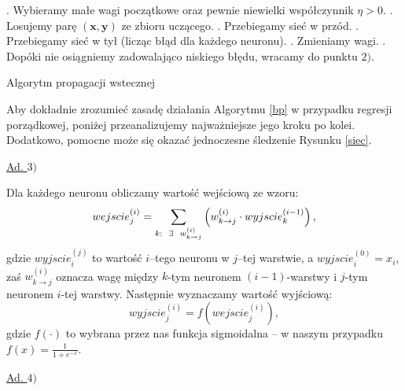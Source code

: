\documentclass{mini}
\begin{document}
\begin{algorithm}
\begin{algorithmic}
\STATE
{}. Wybieramy małe wagi początkowe oraz pewnie niewielki współczynnik $\eta>0$.
\STATE
{}. Losujemy parę $(\textbf{x},\textbf{y})$ ze zbioru uczącego.
\STATE
{}. Przebiegamy sieć w przód.
\STATE
{}. Przebiegamy sieć w tył (licząc błąd dla każdego neuronu).
\STATE
{}. Zmieniamy wagi.
\STATE
{}. Dopóki nie osiągniemy zadowalająco niskiego błędu, wracamy do punktu $2)$.
\end{algorithmic}
\caption{Algorytm propagacji wstecznej}
\label{bp}
\end{algorithm}


Aby dokładnie zrozumieć zasadę działania Algorytmu \ref{bp} w przypadku regresji porządkowej, poniżej przeanalizujemy najważniejsze jego kroku po kolei. Dodatkowo, pomocne może się okazać jednoczesne śledzenie Rysunku \ref{siec}. 

\underline{Ad. $3)$} 

Dla każdego neuronu obliczamy wartość wejściową ze wzoru:
$$
wejscie_j^{(i)} = \sum_{k:\hspace{2mm}\exists\hspace{2mm} w^{(i)}_{k\rightarrow j}} \left( w^{(i)}_{k\rightarrow j}\cdot wyjscie_k^{(i-1)} \right),
$$
gdzie $wyjscie_i^{(j)}$ to wartość $i$--tego neuronu w $j$--tej warstwie, a $wyjscie_i^{(0)} = x_i$, zaś $w^{(i)}_{k\rightarrow j}$ oznacza wagę między $k$-tym neuronem $(i-1)$-warstwy i $j$-tym neuronem $i$-tej warstwy. Następnie wyznaczamy wartość wyjściową:
$$
wyjscie_j^{(i)} = f\left(wejscie_j^{(i)}\right),
$$
gdzie $f(\cdot)$ to wybrana przez nas funkcja sigmoidalna -- w naszym przypadku $f(x) = \frac{1}{1+e^{-x}}$.

\underline{Ad. $4)$}
\end{document}
